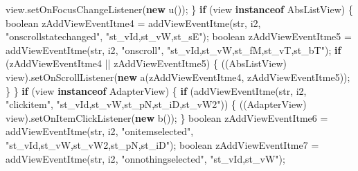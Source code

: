 \documentclass[
]{article}
\newenvironment{Shaded}{}{}
\newcommand{\ControlFlowTok}[1]{\textcolor[rgb]{0.00,0.44,0.13}{\textbf{#1}}}
\newcommand{\DataTypeTok}[1]{\textcolor[rgb]{0.56,0.13,0.00}{#1}}
\newcommand{\FunctionTok}[1]{\textcolor[rgb]{0.02,0.16,0.49}{#1}}
\newcommand{\KeywordTok}[1]{\textcolor[rgb]{0.00,0.44,0.13}{\textbf{#1}}}
\newcommand{\NormalTok}[1]{#1}
\newcommand{\OperatorTok}[1]{\textcolor[rgb]{0.40,0.40,0.40}{#1}}
\newcommand{\StringTok}[1]{\textcolor[rgb]{0.25,0.44,0.63}{#1}}
\begin{document}
\begin{Shaded}
\begin{Highlighting}[]
\NormalTok{            view}\OperatorTok{.}\FunctionTok{setOnFocusChangeListener}\OperatorTok{(}\KeywordTok{new} \FunctionTok{u}\OperatorTok{());}
        \OperatorTok{\}}
        \ControlFlowTok{if} \OperatorTok{(}\NormalTok{view }\KeywordTok{instanceof}\NormalTok{ AbsListView}\OperatorTok{)} \OperatorTok{\{}
            \DataTypeTok{boolean}\NormalTok{ zAddViewEventItme4 }\OperatorTok{=} \FunctionTok{addViewEventItme}\OperatorTok{(}\NormalTok{str}\OperatorTok{,}\NormalTok{ i2}\OperatorTok{,} \StringTok{"onscrollstatechanged"}\OperatorTok{,} \StringTok{"st\_vId,st\_vW,st\_sE"}\OperatorTok{);}
            \DataTypeTok{boolean}\NormalTok{ zAddViewEventItme5 }\OperatorTok{=} \FunctionTok{addViewEventItme}\OperatorTok{(}\NormalTok{str}\OperatorTok{,}\NormalTok{ i2}\OperatorTok{,} \StringTok{"onscroll"}\OperatorTok{,} \StringTok{"st\_vId,st\_vW,st\_fM,st\_vT,st\_bT"}\OperatorTok{);}
            \ControlFlowTok{if} \OperatorTok{(}\NormalTok{zAddViewEventItme4 }\OperatorTok{||}\NormalTok{ zAddViewEventItme5}\OperatorTok{)} \OperatorTok{\{}
                \OperatorTok{((}\NormalTok{AbsListView}\OperatorTok{)}\NormalTok{ view}\OperatorTok{).}\FunctionTok{setOnScrollListener}\OperatorTok{(}\KeywordTok{new} \FunctionTok{a}\OperatorTok{(}\NormalTok{zAddViewEventItme4}\OperatorTok{,}\NormalTok{ zAddViewEventItme5}\OperatorTok{));}
            \OperatorTok{\}}
        \OperatorTok{\}}
        \ControlFlowTok{if} \OperatorTok{(}\NormalTok{view }\KeywordTok{instanceof}\NormalTok{ AdapterView}\OperatorTok{)} \OperatorTok{\{}
            \ControlFlowTok{if} \OperatorTok{(}\FunctionTok{addViewEventItme}\OperatorTok{(}\NormalTok{str}\OperatorTok{,}\NormalTok{ i2}\OperatorTok{,} \StringTok{"clickitem"}\OperatorTok{,} \StringTok{"st\_vId,st\_vW,st\_pN,st\_iD,st\_vW2"}\OperatorTok{))} \OperatorTok{\{}
                \OperatorTok{((}\NormalTok{AdapterView}\OperatorTok{)}\NormalTok{ view}\OperatorTok{).}\FunctionTok{setOnItemClickListener}\OperatorTok{(}\KeywordTok{new} \FunctionTok{b}\OperatorTok{());}
            \OperatorTok{\}}
            \DataTypeTok{boolean}\NormalTok{ zAddViewEventItme6 }\OperatorTok{=} \FunctionTok{addViewEventItme}\OperatorTok{(}\NormalTok{str}\OperatorTok{,}\NormalTok{ i2}\OperatorTok{,} \StringTok{"onitemselected"}\OperatorTok{,} \StringTok{"st\_vId,st\_vW,st\_vW2,st\_pN,st\_iD"}\OperatorTok{);}
            \DataTypeTok{boolean}\NormalTok{ zAddViewEventItme7 }\OperatorTok{=} \FunctionTok{addViewEventItme}\OperatorTok{(}\NormalTok{str}\OperatorTok{,}\NormalTok{ i2}\OperatorTok{,} \StringTok{"onnothingselected"}\OperatorTok{,} \StringTok{"st\_vId,st\_vW"}\OperatorTok{);}

\end{Highlighting}
\end{Shaded}
\end{document}
